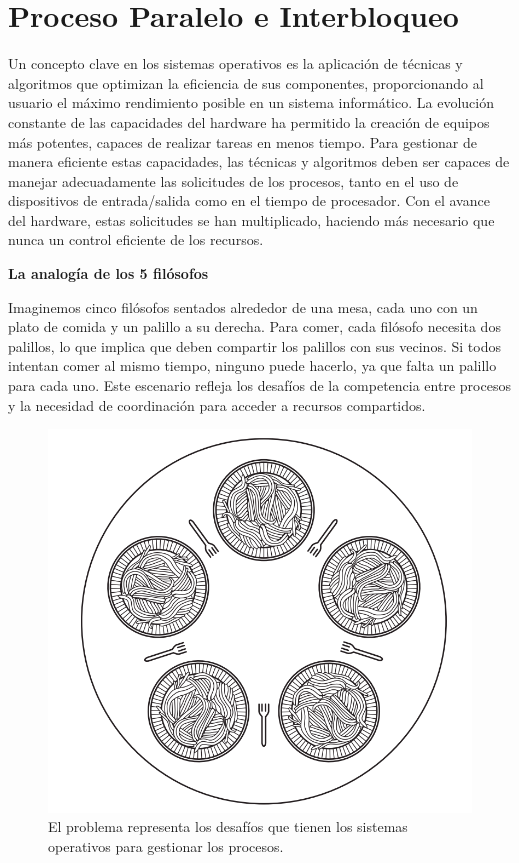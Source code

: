\chapter{Proceso Paralelo e Interbloqueo}

Un concepto clave en los sistemas operativos es la aplicación de técnicas y algoritmos que optimizan la eficiencia de sus componentes, proporcionando al usuario el máximo rendimiento posible en un sistema informático. La evolución constante de las capacidades del hardware ha permitido la creación de equipos más potentes, capaces de realizar tareas en menos tiempo. Para gestionar de manera eficiente estas capacidades, las técnicas y algoritmos deben ser capaces de manejar adecuadamente las solicitudes de los procesos, tanto en el uso de dispositivos de entrada/salida como en el tiempo de procesador. Con el avance del hardware, estas solicitudes se han multiplicado, haciendo más necesario que nunca un control eficiente de los recursos.

\textbf{La analogía de los 5 filósofos}

Imaginemos cinco filósofos sentados alrededor de una mesa, cada uno con un plato de comida y un palillo a su derecha. Para comer, cada filósofo necesita dos palillos, lo que implica que deben compartir los palillos con sus vecinos. Si todos intentan comer al mismo tiempo, ninguno puede hacerlo, ya que falta un palillo para cada uno. Este escenario refleja los desafíos de la competencia entre procesos y la necesidad de coordinación para acceder a recursos compartidos.

\begin{figure}[H] \centering \includegraphics[width=0.8\linewidth]{Imagenes/los5filosofos.png} \caption{El problema representa los desafíos que tienen los sistemas operativos para gestionar los procesos.} \end{figure}

